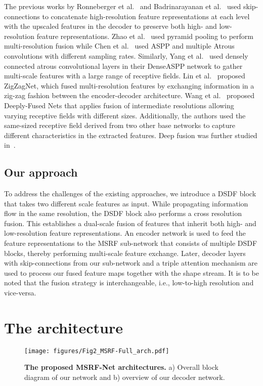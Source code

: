 \documentclass[journal,twoside,web]{IEEEtran}
\newcommand{\sysname}{\text{MSRF-Net}\xspace}
\begin{document}
The previous works by Ronneberger et al.~\cite{ronneberger2015u} and Badrinarayanan et al.~\cite{badrinarayanan2017segnet} used skip-connections to concatenate high-resolution feature representations at each level with the upscaled features in the decoder to preserve both high- and low-resolution feature representations. Zhao et al.~\cite{zhao2017pyramid} used pyramid pooling to perform multi-resolution fusion while Chen et al.~\cite{chen2017deeplab} used \ac{ASPP} and multiple Atrous convolutions with different sampling rates. Similarly, Yang et al.~\cite{yang2018denseaspp} used densely connected atrous convolutional layers in their DenseASPP network to gather multi-scale features with a large range of receptive fields. Lin et al.~\cite{lin2019zigzagnet} proposed ZigZagNet, which fused multi-resolution features by exchanging information in a zig-zag fashion between the encoder-decoder architecture. Wang et al.~\cite{wang2016deeply} proposed Deeply-Fused Nets that applies fusion of intermediate resolutions allowing varying receptive fields with different sizes. Additionally, the authors used the same-sized receptive field derived from two other base networks to capture different characteristics in the extracted features. Deep fusion was further studied in~\cite{zhang2017interleaved,sun2018igcv3,Wang_2020}.



\subsection{Our approach}
 To address the challenges of the existing approaches, we introduce a \ac{DSDF} block that takes two different scale features as input. While propagating information flow in the same resolution, the \ac{DSDF} block also performs a cross resolution fusion. This establishes a dual-scale fusion of features that inherit both high- and low-resolution feature representations. An encoder network is used to feed the feature representations to the \ac{MSRF} sub-network that consists of multiple \ac{DSDF} blocks, thereby performing multi-scale feature exchange. Later, decoder layers with skip-connections from our sub-network and a triple attention mechanism are used to process our fused feature maps together with the shape stream. It is to be noted that the fusion strategy is interchangeable, i.e., low-to-high resolution and vice-versa. 
\section{The \sysname architecture}
\begin{figure*}[!t]
    \centering
    \texttt{[image: figures/Fig2\_MSRF-Full\_arch.pdf]}
    \caption{\textbf{The proposed MSRF-Net architectures.} a) Overall block diagram of our network and b) overview of our decoder network.}
    \label{fig:MSRF-Net}
    \vspace{-3mm}
\end{figure*}
\end{document}
